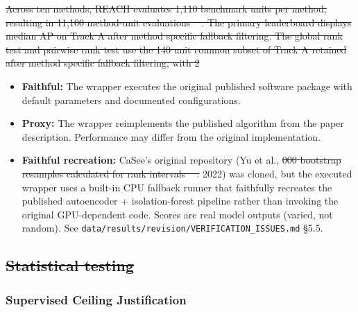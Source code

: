 \documentclass[10pt]{article}
\providecommand{\DIFaddtex}[1]{{\protect\color{trackgreen}#1}} %
\providecommand{\DIFdeltex}[1]{{\protect\color{red}\sout{#1}}}                      %
\providecommand{\DIFaddbegin}{} %
\providecommand{\DIFaddend}{} %
\providecommand{\DIFdelbegin}{} %
\providecommand{\DIFdelend}{} %
\providecommand{\DIFadd}[1]{\texorpdfstring{\DIFaddtex{#1}}{#1}} %
\providecommand{\DIFdel}[1]{\texorpdfstring{\DIFdeltex{#1}}{}} %
\newcommand{\DIFscaledelfig}{0.5}
\newlength{\DIFdelgraphicswidth} %
\newlength{\DIFdelgraphicsheight} %
\newcommand{\DIFaddincludegraphics}[2][]{{\color{trackgreen}\fbox{\DIFOincludegraphics[#1]{#2}}}} %
\newcommand{\DIFdelincludegraphics}[2][]{%
\sbox{\DIFdelgraphicsbox}{\DIFOincludegraphics[#1]{#2}}%
\settoboxwidth{\DIFdelgraphicswidth}{\DIFdelgraphicsbox} %
\settoboxtotalheight{\DIFdelgraphicsheight}{\DIFdelgraphicsbox} %
\scalebox{\DIFscaledelfig}{%
\parbox[b]{\DIFdelgraphicswidth}{\usebox{\DIFdelgraphicsbox}\\[-\baselineskip] \rule{\DIFdelgraphicswidth}{0em}}\llap{\resizebox{\DIFdelgraphicswidth}{\DIFdelgraphicsheight}{%
\setlength{\unitlength}{\DIFdelgraphicswidth}%
\begin{picture}(1,1)%
\thicklines\linethickness{2pt} %
{\color[rgb]{1,0,0}\put(0,0){\framebox(1,1){}}}%
{\color[rgb]{1,0,0}\put(0,0){\line( 1,1){1}}}%
{\color[rgb]{1,0,0}\put(0,1){\line(1,-1){1}}}%
\end{picture}%
}\hspace*{3pt}}} %
} %
\DeclareRobustCommand{\DIFaddbegin}{\DIFOaddbegin \let\includegraphics\DIFaddincludegraphics} %
\DeclareRobustCommand{\DIFaddend}{\DIFOaddend \let\includegraphics\DIFOincludegraphics} %
\DeclareRobustCommand{\DIFdelbegin}{\DIFOdelbegin \let\includegraphics\DIFdelincludegraphics} %
\DeclareRobustCommand{\DIFdelend}{\DIFOaddend \let\includegraphics\DIFOincludegraphics} %
\providecommand{\tightlist}{\setlength{\itemsep}{0pt}\setlength{\parskip}{0pt}}
\begin{document}
\DIFdelbegin \DIFdel{Across ten methods, REACH evaluates 1,110 benchmark units per method, resulting in 11,100 method-unit evaluations \mbox{%
\cite{abdelaal2019comparison,abdelaal2025benchmarking}}\hskip0pt%
. The primary leaderboard displays median AP on
Track A after method specific fallback filtering. The global rank test and pairwise rank test use the 140 unit common subset of Track A retained after method specific fallback filtering, with 2}\DIFdelend \DIFaddbegin \begin{itemize}
\tightlist
\item
  \textbf{\DIFadd{Faithful:}} \DIFadd{The wrapper executes the original published
  software package with default parameters and documented
  configurations.
}\item
  \textbf{\DIFadd{Proxy:}} \DIFadd{The wrapper reimplements the published algorithm from
  the paper description. Performance may differ from the original
  implementation.
}\item
  \textbf{\DIFadd{Faithful recreation:}} \DIFadd{CaSee's original repository (Yu et al.}\DIFaddend ,
  \DIFdelbegin \DIFdel{000 bootstrap resamples calculated for rank intervals \mbox{%
\cite{cao2021benchmark}}\hskip0pt%
. }\DIFdelend \DIFaddbegin \DIFadd{2022) was cloned, but the executed wrapper uses a built-in CPU
  fallback runner that faithfully recreates the published autoencoder +
  isolation-forest pipeline rather than invoking the original
  GPU-dependent code. Scores are real model outputs (varied, not
  random). See }\texttt{\DIFadd{data/results/revision/VERIFICATION\_ISSUES.md}}
  \DIFadd{§5.5.
}\end{itemize}
\DIFaddend 

\DIFdelbegin \subsection{\DIFdel{Statistical testing}}
\addtocounter{subsection}{-1}%
\DIFdelend \DIFaddbegin \subsubsection{\DIFadd{Supervised Ceiling
Justification}}\label{supervised-ceiling-justification}
\DIFaddend 
\end{document}
